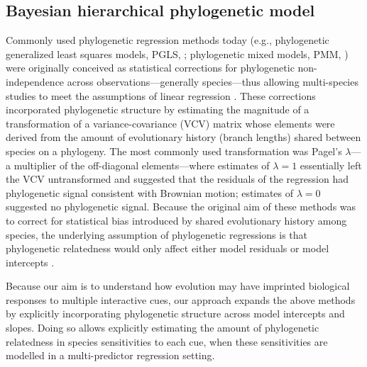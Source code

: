 \documentclass[11pt]{article}
\begin{document}
\subsection*{Bayesian hierarchical phylogenetic model}
Commonly used phylogenetic regression methods today (e.g., phylogenetic generalized least squares models, PGLS, \cite{freckleton2002phylogenetic}; phylogenetic mixed models, PMM, \cite{housworth2004phylogenetic}) were originally conceived as statistical corrections for phylogenetic non-independence across observations---generally species---thus allowing multi-species studies to meet the assumptions of linear regression \citep{freckleton2002phylogenetic}. These corrections incorporated phylogenetic structure by estimating the magnitude of a transformation of a variance-covariance (VCV) matrix whose elements were derived from the amount of evolutionary history (branch lengths) shared between species on a phylogeny. The most commonly used transformation was Pagel's $\lambda$---a multiplier of the off-diagonal elements---where estimates of $\lambda = 1$ essentially left the VCV untransformed and suggested that the residuals of the regression had phylogenetic signal consistent with Brownian motion; estimates of $\lambda = 0$ suggested no phylogenetic signal. %
Because the original aim of these methods was to correct for statistical bias introduced by shared evolutionary history among species, the underlying assumption of phylogenetic regressions is that phylogenetic relatedness would only affect either model residuals \citep[in PGLS approaches,][]{freckleton2002phylogenetic} or model intercepts \citep[e.g., in many PMM approaches,][]{housworth2004phylogenetic}.

Because our aim is to understand how evolution may have imprinted biological responses to multiple interactive cues, our approach expands the above methods by explicitly incorporating phylogenetic structure across model intercepts and slopes. Doing so allows explicitly estimating the amount of phylogenetic relatedness in species sensitivities to each cue, when these sensitivities are modelled in a multi-predictor regression setting.  
\end{document}
